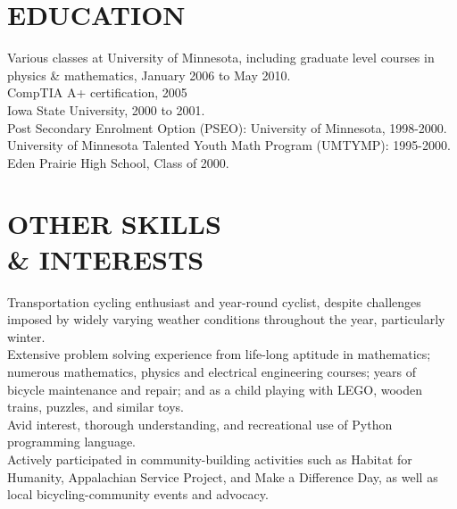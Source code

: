 \documentclass[line,margin]{res}
\begin{document}
\begin{resume}
\section{EDUCATION}
    Various classes at University of Minnesota, including graduate level
    courses in physics \& mathematics, January 2006 to May 2010.
    \vspace{1.5 mm} \\
    CompTIA A+ certification, 2005
    \vspace{1.5 mm} \\
    Iowa State University, 2000 to 2001.
    \vspace{1.5 mm} \\
    Post Secondary Enrolment Option (PSEO): University of Minnesota,
    1998-2000.
    \vspace{1.5 mm} \\
    University of Minnesota Talented Youth Math Program (UMTYMP):
    1995-2000.
    \vspace{1.5 mm} \\
    Eden Prairie High School, Class of 2000.

\section{OTHER SKILLS \\ \& INTERESTS}
    Transportation cycling enthusiast and year-round cyclist, despite
    challenges imposed by widely varying weather conditions throughout the
    year, particularly winter.
    \vspace{1.5 mm} \\
    Extensive problem solving experience from life-long aptitude in
    mathematics; numerous mathematics, physics and electrical engineering
    courses; years of bicycle maintenance and repair; and as a child
    playing with LEGO, wooden trains, puzzles, and similar toys.
    \vspace{1.5 mm} \\
    Avid interest, thorough understanding, and recreational use of Python
    programming language.
    \vspace{1.5 mm} \\
    Actively participated in community-building activities such as Habitat
    for Humanity, Appalachian Service Project, and Make a Difference Day,
    as well as local bicycling-community events and advocacy.

\end{resume}
\end{document}
